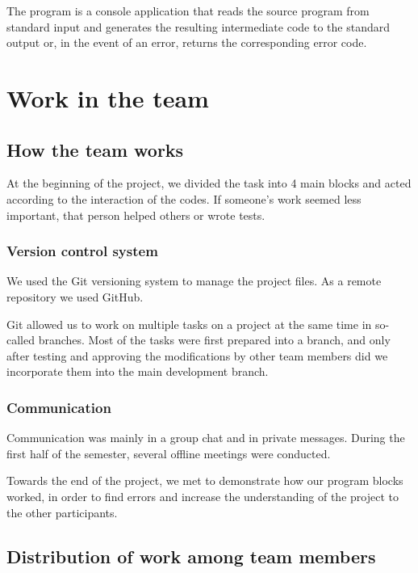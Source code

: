 \documentclass[a4paper, 11pt]{article}
\begin{document}
    The program is a console application that reads the source program from standard input and generates
    the resulting intermediate code to the standard output or, in the event of an error, returns the corresponding error code.



	\section{Work in the team}

	\subsection{How the team works}

    At the beginning of the project, we divided the task into 4 main blocks and acted according to the interaction of the codes. If someone's work seemed less important, that person helped others or wrote tests.
	\subsubsection{Version control system}

	We used the Git versioning system to manage the project files. As a remote repository we used \mbox{GitHub}.

	Git allowed us to work on multiple tasks on a project at the same time in so-called branches. Most of the tasks were first prepared
	into a branch, and only after testing and approving the modifications by other team members did we incorporate them into the main
	development branch.

	\subsubsection{Communication}

	Communication was mainly in a group chat and in private messages. During the first half of the semester, several offline meetings were conducted.

	Towards the end of the project, we met to demonstrate how our program blocks worked, in order to find errors and increase the understanding of the project to the other participants.


	\subsection{Distribution of work among team members}
\end{document}
